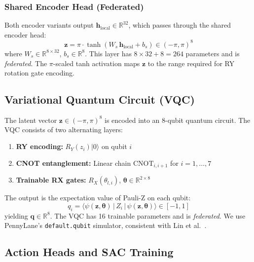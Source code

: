 \documentclass[journal]{IEEEtran}
\begin{document}
\subsubsection{Shared Encoder Head (Federated)}

Both encoder variants output $\mathbf{h}_{\text{local}} \in \mathbb{R}^{32}$,
which passes through the shared encoder head:
%
\begin{equation}
    \mathbf{z} = \pi \cdot \tanh(W_s\,\mathbf{h}_{\text{local}} + b_s)
    \in (-\pi, \pi)^8
\end{equation}
%
where $W_s \in \mathbb{R}^{8 \times 32}$, $b_s \in \mathbb{R}^{8}$.
This layer has $8 \times 32 + 8 = 264$ parameters and is \textit{federated}.
The $\pi$-scaled tanh activation maps $\mathbf{z}$ to the range required
for RY rotation gate encoding.

\subsection{Variational Quantum Circuit (VQC)}

The latent vector $\mathbf{z} \in (-\pi, \pi)^8$ is encoded into
an 8-qubit quantum circuit. The VQC consists of two alternating layers:

\begin{enumerate}
    \item \textbf{RY encoding:} $R_Y(z_i)|0\rangle$ on qubit $i$
    \item \textbf{CNOT entanglement:} Linear chain
          $\text{CNOT}_{i,i+1}$ for $i=1,\ldots,7$
    \item \textbf{Trainable RX gates:}
          $R_X(\theta_{l,i})$, $\boldsymbol{\theta} \in \mathbb{R}^{2 \times 8}$
\end{enumerate}

The output is the expectation value of Pauli-Z on each qubit:
%
\begin{equation}
    q_i = \langle \psi(\mathbf{z},\boldsymbol{\theta})\,|\,
          Z_i\,|\,\psi(\mathbf{z},\boldsymbol{\theta})\rangle \in [-1,1]
\end{equation}
%
yielding $\mathbf{q} \in \mathbb{R}^8$.
The VQC has 16 trainable parameters and is \textit{federated}.
We use PennyLane's \texttt{default.qubit} simulator, consistent with
Lin et al.\ \cite{lin2025qesac}.

\subsection{Action Heads and SAC Training}
\end{document}
